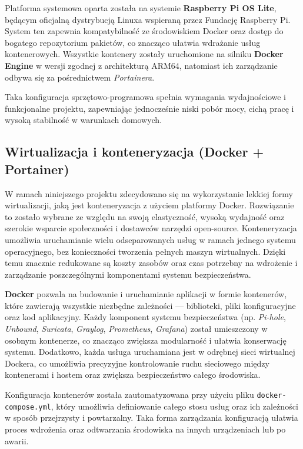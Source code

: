 \documentclass[
    left=2.5cm,         %
    right=2.5cm,        %
    top=2.5cm,          %
    bottom=3cm,         %
    bindingoffset=6mm,  %
    nohyphenation=true %
]{eiti/eiti-thesis} %
\begin{document}
Platforma systemowa oparta została na systemie \textbf{Raspberry Pi OS Lite}\cite{raspberry-os}, będącym oficjalną dystrybucją Linuxa wspieraną przez Fundację Raspberry Pi. System ten zapewnia kompatybilność ze środowiskiem Docker oraz dostęp do bogatego repozytorium pakietów, co znacząco ułatwia wdrażanie usług kontenerowych. Wszystkie kontenery zostały uruchomione na silniku \textbf{Docker Engine} w wersji zgodnej z architekturą ARM64, natomiast ich zarządzanie odbywa się za pośrednictwem \textit{Portainera}.

Taka konfiguracja sprzętowo-programowa spełnia wymagania wydajnościowe i funkcjonalne projektu, zapewniając jednocześnie niski pobór mocy, cichą pracę i wysoką stabilność w warunkach domowych.

\subsection{Wirtualizacja i konteneryzacja (Docker + Portainer)}

W ramach niniejszego projektu zdecydowano się na wykorzystanie lekkiej formy wirtualizacji, jaką jest konteneryzacja z użyciem platformy Docker\cite{docker-wiki}. Rozwiązanie to zostało wybrane ze względu na swoją elastyczność, wysoką wydajność oraz szerokie wsparcie społeczności i dostawców narzędzi open-source. Konteneryzacja umożliwia uruchamianie wielu odseparowanych usług w ramach jednego systemu operacyjnego, bez konieczności tworzenia pełnych maszyn wirtualnych. Dzięki temu znacznie redukowane są koszty zasobów oraz czas potrzebny na wdrożenie i zarządzanie poszczególnymi komponentami systemu bezpieczeństwa.

\textbf{Docker} pozwala na budowanie i uruchamianie aplikacji w formie kontenerów, które zawierają wszystkie niezbędne zależności — biblioteki, pliki konfiguracyjne oraz kod aplikacyjny. Każdy komponent systemu bezpieczeństwa (np. \textit{Pi-hole}, \textit{Unbound}, \textit{Suricata}, \textit{Graylog}, \textit{Prometheus}, \textit{Grafana}) został umieszczony w osobnym kontenerze, co znacząco zwiększa modularność i ułatwia konserwację systemu. Dodatkowo, każda usługa uruchamiana jest w odrębnej sieci wirtualnej Dockera, co umożliwia precyzyjne kontrolowanie ruchu sieciowego między kontenerami i hostem oraz zwiększa bezpieczeństwo całego środowiska.

Konfiguracja kontenerów została zautomatyzowana przy użyciu pliku \texttt{docker-compose.yml}, który umożliwia definiowanie całego stosu usług oraz ich zależności w sposób przejrzysty i powtarzalny. Taka forma zarządzania konfiguracją ułatwia proces wdrożenia oraz odtwarzania środowiska na innych urządzeniach lub po awarii.
\end{document}

